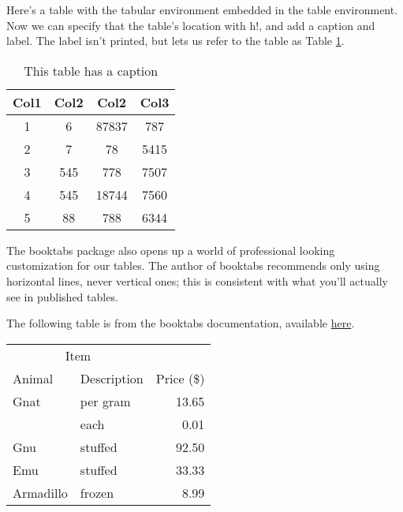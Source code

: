 \documentclass{article}
\begin{document}
Here's a table with the tabular environment embedded in the table environment. Now we can specify that the table's location with h!, and add a caption and label. The label isn't printed, but lets us refer to the table as Table \ref{table:1}.

\begin{table}[h!]
	\centering
	\begin{tabular}{||c c c c||} 
		\hline
		Col1 & Col2 & Col2 & Col3 \\ [0.5ex] 
		\hline\hline
		1 & 6 & 87837 & 787 \\ 
		2 & 7 & 78 & 5415 \\
		3 & 545 & 778 & 7507 \\
		4 & 545 & 18744 & 7560 \\
		5 & 88 & 788 & 6344 \\ [1ex] 
		\hline
	\end{tabular}
	\caption{This table has a caption\label{table:1}}
\end{table}


The booktabs package also opens up a world of professional looking customization for our tables. The author of booktabs recommends only using horizontal lines, never vertical ones; this is consistent with what you'll actually see in published tables.

The following table is from the booktabs documentation, available \href{http://ftp.math.purdue.edu/mirrors/ctan.org/macros/latex/contrib/booktabs/booktabs.pdf}{here}.


\begin{table}[h!]
	\centering
	\begin{tabular}{llr} \toprule
		\multicolumn{2}{c}{Item} \\ \cmidrule(r){1-2} \cmidrule(l){3-3}
		Animal & Description & Price (\$)\\ \midrule
		Gnat & per gram & 13.65 \\
		& each & 0.01 \\
		Gnu & stuffed & 92.50 \\
		Emu & stuffed & 33.33 \\ \addlinespace
		Armadillo & frozen & 8.99 \\ \bottomrule
	\end{tabular}
\end{table}
\end{document}
